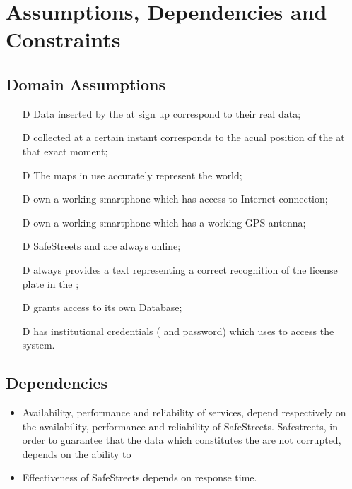 \documentclass[../../rasd.tex]{subfiles}
\begin{document}
\section{Assumptions, Dependencies and Constraints}
	\subsection{Domain Assumptions}
	 	\begin{itemize}
	 		\item[D\subs{1}]Data inserted by the  at sign up correspond to their real data;
	 		\item[D\subs{2}] collected at a certain instant corresponds to the acual position of the  at that exact moment;
	 		\item[D\subs{3}]The maps in use accurately represent the world;
	 		\item[D\subs{4}] own a working smartphone which has access to Internet connection;
	 		\item[D\subs{5}] own a working smartphone which has a working GPS antenna;
	 		\item[D\subs{6}]SafeStreets and  are always online;
	 		\item[D\subs{7}] always provides a text representing a correct recognition of the license plate in the ;
	 		\item[D\subs{8}] grants access to its own  Database;
	 		\item[D\subs{9}] has institutional credentials ( and password) which uses to access the system.
	 	\end{itemize}
 	
 	\subsection{Dependencies}
 		\begin{itemize}
 		\item Availability, performance and reliability of services, depend respectively on the availability, performance and reliability of SafeStreets. 
 		Safestreets, in order to guarantee that the data which constitutes the  are not corrupted, depends on the ability to 
 		\item Effectiveness of SafeStreets depends on  response time. 
 
 		\end{itemize}
\end{document}
